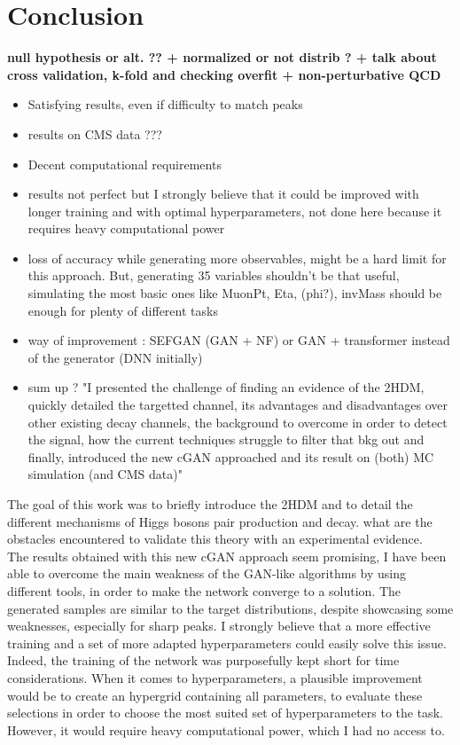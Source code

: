 \section{Conclusion}

\textbf{null hypothesis or alt. ?? + normalized or not distrib ? + talk about cross validation, k-fold and checking overfit + non-perturbative QCD}

\begin{itemize}
    \item Satisfying results, even if difficulty to match peaks
    \item results on CMS data ???
    \item Decent computational requirements
    \item results not perfect but I strongly believe that it could be improved with longer training and with optimal hyperparameters, not done here because it requires heavy computational power
    \item loss of accuracy while generating more observables, might be a hard limit for this approach. But, generating 35 variables shouldn't be that useful, simulating the most basic ones like MuonPt, Eta, (phi?), invMass should be enough for plenty of different tasks
    \item way of improvement : SEFGAN (GAN + NF) or GAN + transformer instead of the generator (DNN initially)
    \item sum up ? "I presented the challenge of finding an evidence of the 2HDM, quickly detailed the targetted channel, its advantages and disadvantages over other existing decay channels, the background to overcome in order to detect the signal, how the current techniques struggle to filter that bkg out and finally, introduced the new cGAN approached and its result on (both) MC simulation (and CMS data)"
\end{itemize}

The goal of this work was to briefly introduce the 2HDM and to detail the different mechanisms of Higgs bosons pair production and decay. what are the obstacles encountered to validate this theory with an experimental evidence.\\

The results obtained with this new cGAN approach seem promising, I have been able to overcome the main weakness of the GAN-like algorithms by using different tools, in order to make the network converge to a solution. The generated samples are similar to the target distributions, despite showcasing some weaknesses, especially for sharp peaks. I strongly believe that a more effective training and a set of more adapted hyperparameters could easily solve this issue. Indeed, the training of the network was purposefully kept short for time considerations. When it comes to hyperparameters, a plausible improvement would be to create an hypergrid containing all parameters, to evaluate these selections in order to choose the most suited set of hyperparameters to the task. However, it would require heavy computational power, which I had no access to.\\

